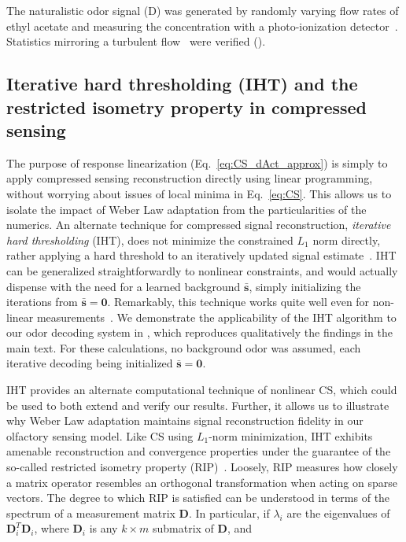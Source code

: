 \documentclass[9pt,lineno]{elife}
\begin{document}
The naturalistic odor signal (D) was generated by randomly varying flow rates of ethyl acetate and measuring the concentration with a photo-ionization detector~\citep{srinivas_elife}. Statistics mirroring a turbulent flow~\citep{celani} were verified (). \\


\subsection{Iterative hard thresholding (IHT) and the restricted isometry property in compressed sensing} 


The purpose of response linearization (Eq.~\ref{eq:CS_dAct_approx}) is simply to apply compressed sensing reconstruction directly using linear programming, without worrying about issues of local minima in Eq.~\ref{eq:CS}. This allows us to isolate the impact  of Weber Law adaptation from the particularities of the numerics. An alternate technique for compressed signal reconstruction, \textit{iterative hard thresholding} (IHT), does not minimize the constrained $L_1$ norm directly, rather applying a hard threshold to an iteratively updated signal estimate~\citep{IHT}. IHT can be generalized straightforwardly to nonlinear constraints, and would actually dispense with the need for a learned background $\bar{\mathbf s}$, simply initializing the iterations from $\bar{\mathbf s} = \mathbf 0$. Remarkably, this technique works quite well even for non-linear measurements~\citep{nonlin_CS}. We demonstrate the applicability of the IHT algorithm to our odor decoding system in , which reproduces qualitatively the findings in the main text. For these calculations, no background odor was assumed, each iterative decoding being initialized $\bar {\mathbf s} = \mathbf {0}$.

IHT provides an alternate computational technique of nonlinear CS, which could be used to both extend and verify our results. Further, it allows us to illustrate why Weber Law adaptation maintains signal reconstruction fidelity in our olfactory sensing model. Like CS using $L_1$-norm minimization, IHT exhibits amenable reconstruction and convergence properties under the guarantee of the so-called restricted isometry property (RIP)~\citep{CS_tao_2}. Loosely, RIP measures how closely a matrix operator resembles an orthogonal transformation when acting on sparse vectors. The degree to which RIP is satisfied can be understood in terms of the spectrum of a measurement matrix $\mathbf D$. In particular, if $\lambda_i$ are the eigenvalues of $\mathbf {D}_i^T\mathbf {D}_i$, where $\mathbf D_i$ is any $k \times m$ submatrix of $\mathbf D$, and 
\end{document}
